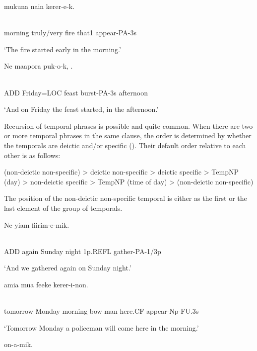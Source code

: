 \ea%
\label{ex:x872}
\gll {}  mukuna  nain  kerer-e-k. \\
      \\
\glt
\z

morning  truly/very  fire  that1  appear-PA-3s

`The fire started early in the morning.'

\ea%
\label{ex:x873}
\gll Ne    maapora  puk-o-k,  . \\
      \\
\glt
\z

ADD  Friday=LOC  feast  burst-PA-3s  afternoon

`And on Friday the feast started, in the afternoon.'

Recursion of temporal phrases is possible and quite common.  When there are two or more temporal phrases in the same clause, the order is determined by whether the temporals are deictic and/or specific ().  Their default order relative to each other is as follows:

(non-deictic non-specific) {{\textgreater}} deictic non-specific {{\textgreater}} deictic specific {{\textgreater}} TempNP (day) {{\textgreater}} non-deictic specific {{\textgreater}} TempNP (time of day) {{\textgreater}} (non-deictic non-specific)

The position of the non-deictic non-specific temporal is either as the first or the last element of the group of temporals.

\ea%
\label{ex:x874}
\gll Ne    yiam  fiirim-e-mik. \\
      \\
\glt
\z

ADD  again  Sunday  night  1p.REFL  gather-PA-1/3p

`And we gathered again on Sunday night.'

\ea%
\label{ex:x875}
\gll {}    amia  mua  feeke  kerer-i-non. \\
      \\
\glt
\z

tomorrow  Monday  morning  bow  man  here.CF  appear-Np-FU.3s

`Tomorrow Monday a policeman will come here in the morning.'

\ea%
\label{ex:x877}
\gll {}  on-a-mik. \\
      \\
\glt
\z

